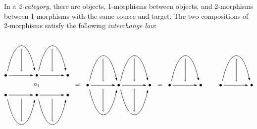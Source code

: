 \documentclass[12pt]{memoir}
\begin{document}
\begin{ptcb}
    In a \emph{2-category}, there are objects, 1-morphisms between objects, and 2-morphisms between 1-morphisms with the same source and target. The two compositions of 2-morphisms satisfy the following \emph{interchange law}:\par
    \[
    \begin{tikzpicture}[x=1pt,y=1pt,font=\normalsize,
        line width=.6pt,
        arrows={-{Latex[length=1.8mm,width=1.2mm]}},
        two cell/.style={double,double distance=.7pt,line width=.3pt,
            arrows={-{Implies[length=2mm,width=1.6mm]}}},
        pics/upper cell/.style={code={
            \draw (3,7) .. controls (15,61) and (35,61) .. (47,7);
            \draw[two cell] (25,43) -- (25,6);
        }},
        pics/lower cell/.style={code={
            \draw (3,-7) .. controls (15,-61) and (35,-61) .. (47,-7);
            \draw[two cell] (25,-6) -- (25,-43);
        }}]
        \begin{scope}[shift={(0,16)}]
            \foreach \x in {0,50,100} \fill (\x,0) circle[radius=2pt];
            \foreach \x in {0,50} {
                \draw (\x+5,0) -- (\x+45,0);
                \pic at (\x,0) {upper cell};
            }
        \end{scope}
        \node at (50,0) {$\circ_1$};
        \begin{scope}[shift={(0,-16)}]
            \foreach \x in {0,50,100} \fill (\x,0) circle[radius=2pt];
            \foreach \x in {0,50} {
                \draw (\x+5,0) -- (\x+45,0);
                \pic at (\x,0) {lower cell};
            }
        \end{scope}
        \node at (116,0) {$=$};
        \begin{scope}[shift={(132,0)}]
            \foreach \x in {0,50,100} \fill (\x,0) circle[radius=2pt];
            \foreach \x in {0,50} {
                \draw (\x+5,0) -- (\x+45,0);
                \pic at (\x,0) {upper cell};
                \pic at (\x,0) {lower cell};
            }
        \end{scope}
        \node at (248,0) {$=$};
        \foreach \x in {264,346} {
            \begin{scope}[shift={(\x,0)}]
                \fill (0,0) circle[radius=2pt];
                \fill (50,0) circle[radius=2pt];
                \draw (5,0) -- (45,0);
                \pic {upper cell};

\end{scope}}
\end{tikzpicture}\]
\end{ptcb}
\end{document}

